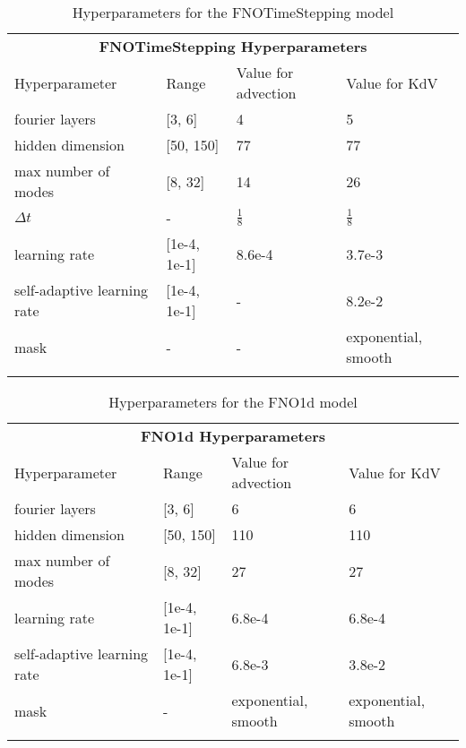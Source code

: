 \begin{table}[h]
    \centering
    \caption{Hyperparameters for the FNOTimeStepping model}
    \begin{tabular}{@{}llll@{}}
    \multicolumn{4}{c}{\textbf{FNOTimeStepping Hyperparameters}} \\  %
    \cmidrule(r){1-4}  %
    Hyperparameter & Range & Value for advection & Value for KdV \\
    \midrule
    fourier layers & [3, 6] & 4 & 5 \\
    hidden dimension & [50, 150] & 77 & 77 \\
    max number of modes & [8, 32] & 14 & 26 \\
    \(\Delta t\)  & - & \(\frac{1}{8}\) & \(\frac{1}{8}\)\\
    learning rate & [1e-4, 1e-1] & 8.6e-4 & 3.7e-3\\
    self-adaptive learning rate & [1e-4, 1e-1] & - & 8.2e-2\\
    mask & - & - & exponential, smooth \\
    \label{tab:hyperparameter_search_space_fno_timestepping}
    \end{tabular}
\end{table}

\begin{table}[h]
    \centering
    \caption{Hyperparameters for the FNO1d model}
    \begin{tabular}{@{}llll@{}}
    \multicolumn{4}{c}{\textbf{FNO1d Hyperparameters}} \\  %
    \cmidrule(r){1-4}  %
    Hyperparameter & Range & Value for advection & Value for KdV \\
    \midrule
    fourier layers & [3, 6] & 6 & 6 \\
    hidden dimension & [50, 150] & 110 & 110 \\
    max number of modes & [8, 32] & 27 & 27 \\
    learning rate & [1e-4, 1e-1] & 6.8e-4 & 6.8e-4\\
    self-adaptive learning rate & [1e-4, 1e-1] & 6.8e-3 & 3.8e-2\\
    mask & - & exponential, smooth & exponential, smooth \\
    \label{tab:hyperparameter_search_space_fno1d}
    \end{tabular}
\end{table}

